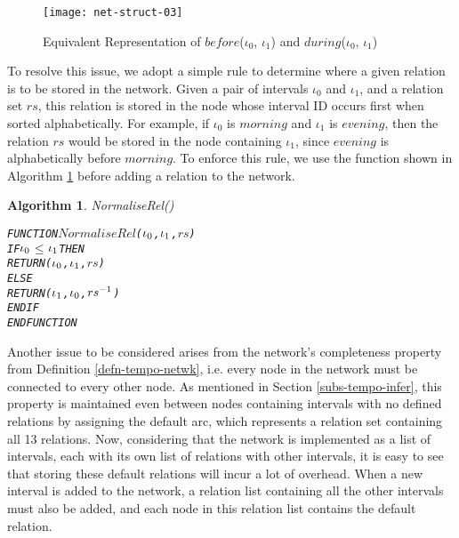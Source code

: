 \documentclass[11pt]{report}
\newenvironment{vverbatim}
{
  \begin{alltt}
}
{
    \vspace{-\baselineskip}
  \end{alltt}
}
\newtheorem{vvalgorithm}{Algorithm}[chapter]
\newenvironment{valgorithm}[2]
{
  \begin{vvalgorithm}{#1}
    \label{#2}
    \small
    \begin{vverbatim}
}
{
    \end{vverbatim}
  \end{vvalgorithm}
}
\begin{document}
          \begin{figure}[tbhp]
            \begin{center}
              \texttt{[image: net-struct-03]}
              \caption{Equivalent Representation of $before$($\iota_0$, $\iota_1$) and $during$($\iota_0$, $\iota_1$)}
              \label{figu-impln-nws03}
            \end{center}
          \end{figure}

          To resolve this issue, we adopt a simple rule to determine where a
          given relation is to be stored in the network. Given a pair of
          intervals $\iota_0$ and $\iota_1$, and a relation set $rs$, this
          relation is stored in the node whose interval ID occurs first when
          sorted alphabetically. For example, if $\iota_0$ is $morning$ and
          $\iota_1$ is $evening$, then the relation $rs$ would be stored
          in the node containing $\iota_1$, since $evening$ is alphabetically
          before $morning$. To enforce this rule, we use the function shown
          in Algorithm \ref{algo-impln-norml} before adding a relation to the
          network.

          \begin{valgorithm}{NormaliseRel()}{algo-impln-norml}
FUNCTION \(NormaliseRel\)(\(\iota\sb{0}\), \(\iota\sb{1}\), \(rs\))
  IF \(\iota\sb{0}\) \(\leq\) \(\iota\sb{1}\) THEN
    RETURN (\(\iota\sb{0}\), \(\iota\sb{1}\), \(rs\))
  ELSE
    RETURN (\(\iota\sb{1}\), \(\iota\sb{0}\), \(rs\sp{-1}\))
  ENDIF
ENDFUNCTION
          \end{valgorithm}

          Another issue to be considered arises from the network's completeness
          property from Definition \ref{defn-tempo-netwk}, i.e. every node in
          the network must be connected to every other node. As mentioned in
          Section \ref{subs-tempo-infer}, this property is maintained even
          between nodes containing intervals with no defined relations by
          assigning the default arc, which represents a relation set containing
          all 13 relations. Now, considering that the network is implemented
          as a list of intervals, each with its own list of relations with
          other intervals, it is easy to see that storing these default
          relations will incur a lot of overhead. When a new interval is added
          to the network, a relation list containing all the other intervals
          must also be added, and each node in this relation list contains the
          default relation.
\end{document}
